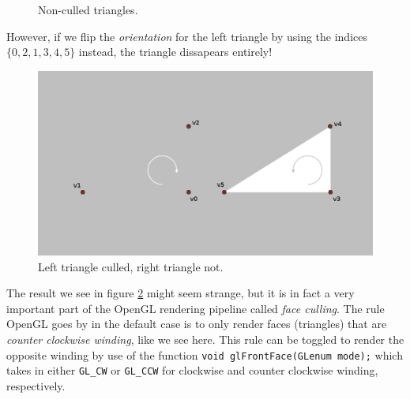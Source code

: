 \documentclass[]{article}
\begin{document}
\begin{multicols}{2}
\begin{figure}[H]
\caption{Non-culled triangles.}
\label{fig:nonculled}
\end{figure}
However, if we flip the \textit{orientation} for the left triangle by using the indices $\{0, 2, 1, 3, 4, 5\}$ instead, the triangle dissapears entirely!
\begin{figure}[H]
\centering
\includegraphics[width=\columnwidth]{culling2.png}
\caption{Left triangle culled, right triangle not.}
\label{fig:nonculled}
\end{figure}
The result we see in figure \ref{fig:nonculled} might seem strange, but it is in fact a very important part of the OpenGL rendering pipeline called \textit{face culling}. The rule OpenGL goes by in the default case is to only render faces (triangles) that are \textit{counter clockwise winding}, like we see here. This rule can be toggled to render the opposite winding by use of the function \texttt{void glFrontFace(GLenum mode);} which takes in either \texttt{GL\_CW} or \texttt{GL\_CCW} for clockwise and counter clockwise winding, respectively.

\end{multicols}
\end{document}
